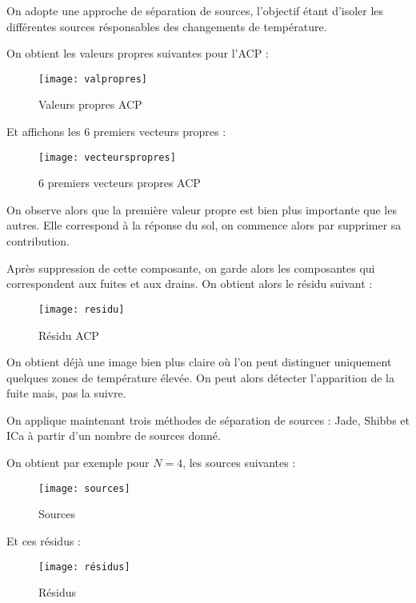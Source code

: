 \documentclass[12pt,a4paper,titlepage]{scrartcl}
\begin{document}
On adopte une approche de séparation de sources, l'objectif étant d'isoler les différentes
sources résponsables des changements de température.

On obtient les valeurs propres suivantes pour l'ACP :

\begin{figure}[H]
    \caption{Valeurs propres ACP}
    \texttt{[image: valpropres]}
    \centering
\end{figure}

Et affichons les 6 premiers vecteurs propres :

\begin{figure}[H]
    \caption{6 premiers vecteurs propres ACP}
    \texttt{[image: vecteurspropres]}
    \centering
\end{figure}

On observe alors que la première valeur propre est bien plus importante que les autres. Elle
correspond à la réponse du sol, on commence alors par supprimer sa contribution.

Après suppression de cette composante, on garde alors les composantes qui correspondent
aux fuites et aux drains. On obtient alors le résidu suivant :

\begin{figure}[H]
    \caption{Résidu ACP}
    \texttt{[image: residu]}
    \centering
\end{figure}

On obtient déjà une image bien plus claire où l'on peut distinguer uniquement quelques
zones de température élevée. On peut alors détecter l'apparition de la fuite mais, pas
la suivre.

On applique maintenant trois méthodes de séparation de sources : Jade, Shibbs et ICa à partir
d'un nombre de sources donné.

On obtient par exemple pour $N = 4$, les sources suivantes :

\begin{figure}[H]
    \caption{Sources}
    \texttt{[image: sources]}
    \centering
\end{figure}

Et ces résidus :

\begin{figure}[H]
    \caption{Résidus}
    \texttt{[image: résidus]}
    \centering
\end{figure}

\end{document}
